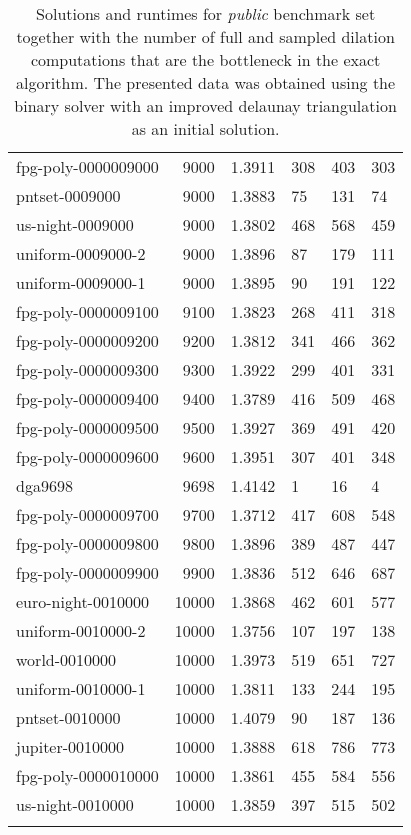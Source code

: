 \begin{longtable}{|lrrlll|}
fpg-poly-0000009000 & 9000 & \num{1.3911} & \num{308} & \num{403} & \num{303} \\
pntset-0009000 & 9000 & \num{1.3883} & \num{75} & \num{131} & \num{74} \\
us-night-0009000 & 9000 & \num{1.3802} & \num{468} & \num{568} & \num{459} \\
uniform-0009000-2 & 9000 & \num{1.3896} & \num{87} & \num{179} & \num{111} \\
uniform-0009000-1 & 9000 & \num{1.3895} & \num{90} & \num{191} & \num{122} \\
fpg-poly-0000009100 & 9100 & \num{1.3823} & \num{268} & \num{411} & \num{318} \\
fpg-poly-0000009200 & 9200 & \num{1.3812} & \num{341} & \num{466} & \num{362} \\
fpg-poly-0000009300 & 9300 & \num{1.3922} & \num{299} & \num{401} & \num{331} \\
fpg-poly-0000009400 & 9400 & \num{1.3789} & \num{416} & \num{509} & \num{468} \\
fpg-poly-0000009500 & 9500 & \num{1.3927} & \num{369} & \num{491} & \num{420} \\
fpg-poly-0000009600 & 9600 & \num{1.3951} & \num{307} & \num{401} & \num{348} \\
dga9698 & 9698 & \num{1.4142} & \num{1} & \num{16} & \num{4} \\
fpg-poly-0000009700 & 9700 & \num{1.3712} & \num{417} & \num{608} & \num{548} \\
fpg-poly-0000009800 & 9800 & \num{1.3896} & \num{389} & \num{487} & \num{447} \\
fpg-poly-0000009900 & 9900 & \num{1.3836} & \num{512} & \num{646} & \num{687} \\
euro-night-0010000 & 10000 & \num{1.3868} & \num{462} & \num{601} & \num{577} \\
uniform-0010000-2 & 10000 & \num{1.3756} & \num{107} & \num{197} & \num{138} \\
world-0010000 & 10000 & \num{1.3973} & \num{519} & \num{651} & \num{727} \\
uniform-0010000-1 & 10000 & \num{1.3811} & \num{133} & \num{244} & \num{195} \\
pntset-0010000 & 10000 & \num{1.4079} & \num{90} & \num{187} & \num{136} \\
jupiter-0010000 & 10000 & \num{1.3888} & \num{618} & \num{786} & \num{773} \\
fpg-poly-0000010000 & 10000 & \num{1.3861} & \num{455} & \num{584} & \num{556} \\
us-night-0010000 & 10000 & \num{1.3859} & \num{397} & \num{515} & \num{502} \\
\hline

\caption{Solutions and runtimes for \emph{public} benchmark set together with the number 
         of full and sampled dilation computations that are the bottleneck in the exact algorithm. 
         The presented data was obtained using the binary solver with an improved delaunay triangulation as an initial solution.}
\label{tab:public-comparison}
\end{longtable}
